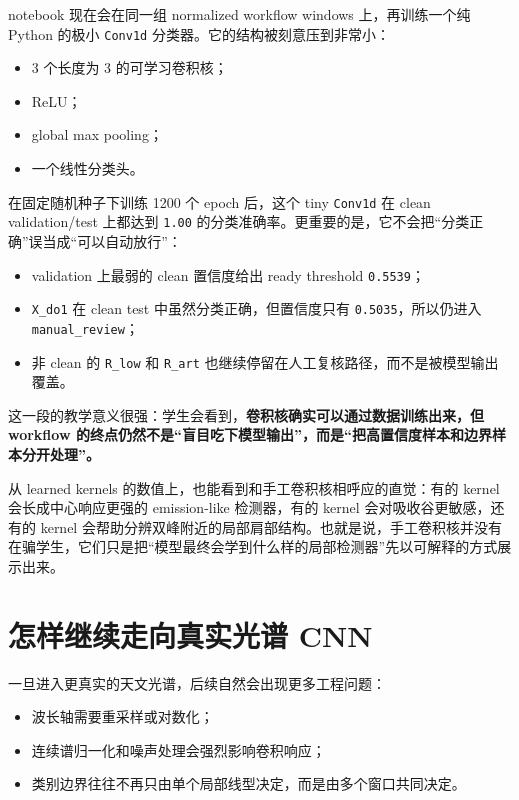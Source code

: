 notebook 现在会在同一组 normalized workflow windows 上，再训练一个纯 Python 的极小 \texttt{Conv1d} 分类器。它的结构被刻意压到非常小：

\begin{itemize}
    \item 3 个长度为 3 的可学习卷积核；
    \item ReLU；
    \item global max pooling；
    \item 一个线性分类头。
\end{itemize}

在固定随机种子下训练 1200 个 epoch 后，这个 tiny \texttt{Conv1d} 在 clean validation/test 上都达到 \texttt{1.00} 的分类准确率。更重要的是，它不会把“分类正确”误当成“可以自动放行”：

\begin{itemize}
    \item validation 上最弱的 clean 置信度给出 ready threshold \texttt{0.5539}；
    \item \texttt{X\_do1} 在 clean test 中虽然分类正确，但置信度只有 \texttt{0.5035}，所以仍进入 \texttt{manual\_review}；
    \item 非 clean 的 \texttt{R\_low} 和 \texttt{R\_art} 也继续停留在人工复核路径，而不是被模型输出覆盖。
\end{itemize}

这一段的教学意义很强：学生会看到，\textbf{卷积核确实可以通过数据训练出来，但 workflow 的终点仍然不是“盲目吃下模型输出”，而是“把高置信度样本和边界样本分开处理”。}

从 learned kernels 的数值上，也能看到和手工卷积核相呼应的直觉：有的 kernel 会长成中心响应更强的 emission-like 检测器，有的 kernel 会对吸收谷更敏感，还有的 kernel 会帮助分辨双峰附近的局部肩部结构。也就是说，手工卷积核并没有在骗学生，它们只是把“模型最终会学到什么样的局部检测器”先以可解释的方式展示出来。

\section{怎样继续走向真实光谱 CNN}

一旦进入更真实的天文光谱，后续自然会出现更多工程问题：

\begin{itemize}
    \item 波长轴需要重采样或对数化；
    \item 连续谱归一化和噪声处理会强烈影响卷积响应；
    \item 类别边界往往不再只由单个局部线型决定，而是由多个窗口共同决定。
\end{itemize}

